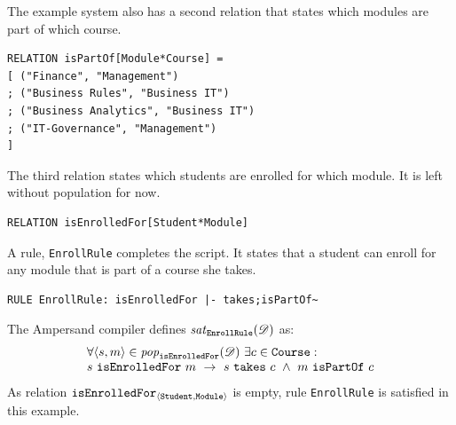 \documentclass[runningheads]{llncs}
\newcommand{\id}[1]{\text{\it #1\/}}
\newcommand{\pop}[2]{\id{pop}_{#1}(#2)}
\newcommand{\sat}[2]{\id{sat}_{#1}(#2)}
\newcommand{\declare}[3]{\id{#1}_{\pair{#2}{#3}}}
\newcommand{\pair}[2]{\langle{#1},{#2}\rangle}
\newcommand{\dataset}{\mathscr{D}}
\begin{document}
   The example system also has a second relation that states which modules are part of which course.
\begin{verbatim}
RELATION isPartOf[Module*Course] =
[ ("Finance", "Management")
; ("Business Rules", "Business IT")
; ("Business Analytics", "Business IT")
; ("IT-Governance", "Management")
]
\end{verbatim}
   The third relation states which students are enrolled for which module.
   It is left without population for now.
\begin{verbatim}
RELATION isEnrolledFor[Student*Module]
\end{verbatim}

   A rule, {\tt EnrollRule} completes the script.
   It states that a student can enroll for any module that is part of a course she takes.
\begin{verbatim}
RULE EnrollRule: isEnrolledFor |- takes;isPartOf~
\end{verbatim}
   The Ampersand compiler defines $\sat{\tt EnrollRule}{\dataset}$ as:
\begin{equation}
   \begin{array}{l}
   \forall \pair{s}{m}\in\pop{\tt isEnrolledFor}{\dataset}\ \exists c\in\text{\tt Course}:\\
   s\ \text{\tt isEnrolledFor}\ m\ \rightarrow\ s\ \text{\tt takes}\ c\ \wedge\ m\ \text{\tt isPartOf}\ c
   \end{array}
\label{eqn:example isEnrolledFor}
\end{equation}
   As relation $\declare{\tt isEnrolledFor}{\tt Student}{\tt Module}$ is empty, rule {\tt EnrollRule} is satisfied in this example.
\end{document}
